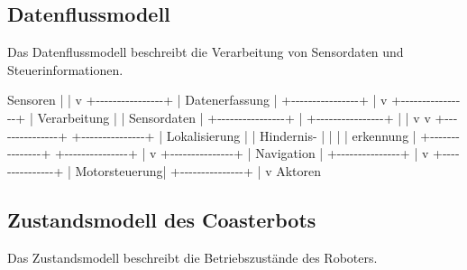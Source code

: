 \documentclass[
  a4paper,
  12pt,
  DIV=12,        %
  parskip=half,  %
  headings=small %
]{scrartcl}
\theoremstyle{definition}
\theoremstyle{definition}
\newenvironment{Shaded}{}{}
\newcommand{\NormalTok}[1]{#1}
\begin{document}
\subsection{Datenflussmodell}\label{datenflussmodell}

Das Datenflussmodell beschreibt die Verarbeitung von Sensordaten und
Steuerinformationen.

\begin{Shaded}
\begin{Highlighting}[]
\NormalTok{Sensoren}
\NormalTok{   |}
\NormalTok{   |}
\NormalTok{   v}
\NormalTok{+{-}{-}{-}{-}{-}{-}{-}{-}{-}{-}{-}{-}{-}{-}{-}{-}+}
\NormalTok{| Datenerfassung |}
\NormalTok{+{-}{-}{-}{-}{-}{-}{-}{-}{-}{-}{-}{-}{-}{-}{-}{-}+}
\NormalTok{        |}
\NormalTok{        v}
\NormalTok{+{-}{-}{-}{-}{-}{-}{-}{-}{-}{-}{-}{-}{-}{-}{-}{-}+}
\NormalTok{| Verarbeitung   |}
\NormalTok{| Sensordaten    |}
\NormalTok{+{-}{-}{-}{-}{-}{-}{-}{-}{-}{-}{-}{-}{-}{-}{-}{-}+}
\NormalTok{        |}
\NormalTok{        +{-}{-}{-}{-}{-}{-}{-}{-}{-}{-}{-}{-}{-}{-}{-}{-}+}
\NormalTok{        |                |}
\NormalTok{        v                v}
\NormalTok{+{-}{-}{-}{-}{-}{-}{-}{-}{-}{-}{-}{-}{-}{-}{-}+  +{-}{-}{-}{-}{-}{-}{-}{-}{-}{-}{-}{-}{-}{-}{-}+}
\NormalTok{| Lokalisierung |  | Hindernis{-}    |}
\NormalTok{|               |  | erkennung     |}
\NormalTok{+{-}{-}{-}{-}{-}{-}{-}{-}{-}{-}{-}{-}{-}{-}{-}+  +{-}{-}{-}{-}{-}{-}{-}{-}{-}{-}{-}{-}{-}{-}{-}+}
\NormalTok{        |}
\NormalTok{        v}
\NormalTok{+{-}{-}{-}{-}{-}{-}{-}{-}{-}{-}{-}{-}{-}{-}{-}+}
\NormalTok{| Navigation    |}
\NormalTok{+{-}{-}{-}{-}{-}{-}{-}{-}{-}{-}{-}{-}{-}{-}{-}+}
\NormalTok{        |}
\NormalTok{        v}
\NormalTok{+{-}{-}{-}{-}{-}{-}{-}{-}{-}{-}{-}{-}{-}{-}{-}+}
\NormalTok{| Motorsteuerung|}
\NormalTok{+{-}{-}{-}{-}{-}{-}{-}{-}{-}{-}{-}{-}{-}{-}{-}+}
\NormalTok{        |}
\NormalTok{        v}
\NormalTok{     Aktoren}
\end{Highlighting}
\end{Shaded}

\subsection{Zustandsmodell des
Coasterbots}\label{zustandsmodell-des-coasterbots-1}

Das Zustandsmodell beschreibt die Betriebszustände des Roboters.
\end{document}
